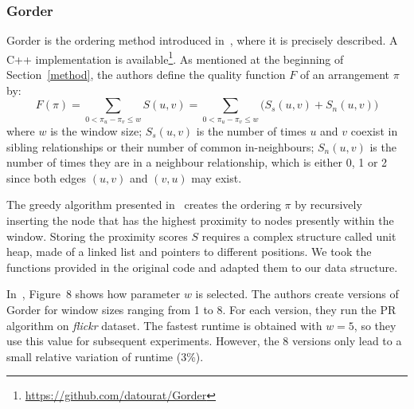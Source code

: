 \subsubsection{Gorder} Gorder is the ordering method introduced in~\cite{gorder}, where it is precisely described. A C++ implementation is available\footnote{\url{https://github.com/datourat/Gorder}}. 
%
As mentioned at the beginning of Section~\ref{method}, the authors define the quality function $F$ of an arrangement $\pi$ by:
$$F(\pi)=\sum_{0<\pi_u-\pi_v\leq w}S(u,v)
=\sum_{0<\pi_u-\pi_v\leq w}\Big(S_s(u,v) + S_n(u,v)\Big)$$
%
where $w$ is the window size;
$S_s(u,v)$ is the number of times $u$ and $v$ coexist in sibling relationships or their number of common in-neighbours; $S_n(u,v)$ is the number of times they are in a neighbour relationship, which is either 0, 1 or 2 since both edges $(u,v)$ and $(v,u)$ may exist.


The greedy algorithm presented in~\cite{gorder} creates the ordering $\pi$ by recursively inserting the node that has the highest proximity to nodes presently within the window.
%
Storing the proximity scores $S$ requires a complex structure called unit heap, made of a linked list and pointers to different positions. We took the functions provided in the original code and adapted them to our data structure.

In~\cite{gorder}, Figure~8 shows how parameter $w$ is selected. 
%
The authors create versions of Gorder for window sizes ranging from 1 to 8. For each version, they run the PR algorithm on \textit{flickr} dataset. The fastest runtime is obtained with $w=5$, so they use this value for subsequent experiments. However, the 8 versions only lead to a small relative variation of runtime (3\%).

